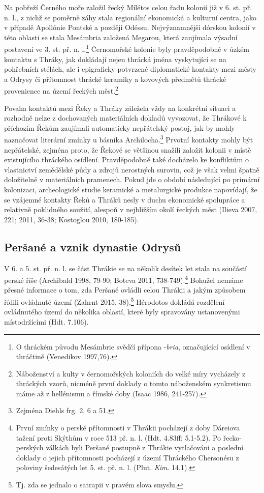 Na pobřeží Černého moře založil řecký Mílétos celou řadu kolonií již v 6. st. př. n. l., z nichž se poměrně záhy stala regionální ekonomická a kulturní centra, jako v případě Apollónie Pontské a později Odéssu. Nejvýznamnější dórskou kolonií v této oblasti se stala Mesámbria založená Megarou, která zaujímala výsadní postavení ve 3. st. př. n. l.\footnote{O thráckém původu Mesámbrie svědčí přípona -{\em bria}, označujícící osídlení v thráčtině (Venedikov 1997,76).} Černomořské kolonie byly pravděpodobně v úzkém kontaktu s Thráky, jak dokládají nejen thrácká jména vyskytující se na pohřebních stélách, ale i epigraficky potvrzené diplomatické kontakty mezi městy a Odrysy či přítomnost thrácké keramiky a kovových předmětů thrácké provenience na území řeckých měst.\footnote{Náboženství a kulty v černomořských koloniích do velké míry vycházely z thráckých vzorů, nicméně první doklady o tomto náboženském synkretismu máme až z hellénismu a římské doby (Isaac 1986, 241-257).}

Povaha kontaktů mezi Řeky a Thráky záležela vždy na konkrétní situaci a rozhodně nelze z dochovaných materiálních dokladů vyvozovat, že Thrákové k příchozím Řekům zaujímali automaticky nepřátelský postoj, jak by mohly naznačovat literární zmínky u básníka Archilocha.\footnote{Zejména Diehls frg. 2, 6 a 51.} Prvotní kontakty mohly být nepřátelské, zejména proto, že Řekové se většinou snažili založit kolonii v místě existujícího thráckého osídlení. Pravděpodobně také docházelo ke konfliktům o vlastnictví zemědělské půdy a zdrojů nerostných surovin, což je však velmi špatně doložitelné v materiálních pramenech. Pokud jde o období následující po primární kolonizaci, archeologické studie keramické a metalurgické produkce napovídají, že se vzájemné kontakty Řeků a Thráků nesly v duchu ekonomické spolupráce a relativně poklidného soužití, alespoň v nejbližším okolí řeckých měst (Ilieva 2007, 221; 2011, 36-38; Kostoglou 2010, 180-185).

\subsection[peršané-a-vznik-dynastie-odrysů]{Peršané a vznik dynastie Odrysů}

V 6. a 5. st. př. n. l. se část Thrákie se na několik desítek let stala na součástí perské říše (Archibald 1998, 79-90; Boteva 2011, 738-749).\footnote{První zmínky o perské přítomnosti v Thrákii pocházejí z doby Dáreiova tažení proti Skýthům v roce 513 př. n. l. (Hdt. 4.83ff; 5.1-5.2). Po řecko-perských válkách byli Peršané postupně z Thrákie vytlačováni a poslední doklady o jejich přítomnosti pocházejí z území Thráckého Chersonésu z poloviny šedesátých let 5. st. př. n. l. (Plut. {\em Kim}. 14.1).} Bohužel nemáme přesné informace o tom, zda Peršané ovládli celou Thrákii a jakým způsobem řídili ovládnuté území (Zahrnt 2015, 38).\footnote{Tj. zda se jednalo o satrapii v pravém slova smyslu.} Hérodotos dokládá rozdělení ovládnutého území do několika oblastí, které byly spravovány ustanovenými místodržícími (Hdt. 7.106).

